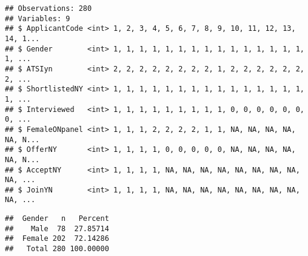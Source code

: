 \documentclass[]{article}
\newenvironment{Shaded}{\begin{snugshade}}{\end{snugshade}}
\newcommand{\KeywordTok}[1]{\textcolor[rgb]{0.13,0.29,0.53}{\textbf{#1}}}
\newcommand{\DataTypeTok}[1]{\textcolor[rgb]{0.13,0.29,0.53}{#1}}
\newcommand{\DecValTok}[1]{\textcolor[rgb]{0.00,0.00,0.81}{#1}}
\newcommand{\StringTok}[1]{\textcolor[rgb]{0.31,0.60,0.02}{#1}}
\newcommand{\CommentTok}[1]{\textcolor[rgb]{0.56,0.35,0.01}{\textit{#1}}}
\newcommand{\OperatorTok}[1]{\textcolor[rgb]{0.81,0.36,0.00}{\textbf{#1}}}
\newcommand{\NormalTok}[1]{#1}
\begin{document}
\begin{verbatim}
## Observations: 280
## Variables: 9
## $ ApplicantCode <int> 1, 2, 3, 4, 5, 6, 7, 8, 9, 10, 11, 12, 13, 14, 1...
## $ Gender        <int> 1, 1, 1, 1, 1, 1, 1, 1, 1, 1, 1, 1, 1, 1, 1, 1, ...
## $ ATSIyn        <int> 2, 2, 2, 2, 2, 2, 2, 2, 1, 2, 2, 2, 2, 2, 2, 2, ...
## $ ShortlistedNY <int> 1, 1, 1, 1, 1, 1, 1, 1, 1, 1, 1, 1, 1, 1, 1, 1, ...
## $ Interviewed   <int> 1, 1, 1, 1, 1, 1, 1, 1, 1, 0, 0, 0, 0, 0, 0, 0, ...
## $ FemaleONpanel <int> 1, 1, 1, 2, 2, 2, 2, 1, 1, NA, NA, NA, NA, NA, N...
## $ OfferNY       <int> 1, 1, 1, 1, 0, 0, 0, 0, 0, NA, NA, NA, NA, NA, N...
## $ AcceptNY      <int> 1, 1, 1, 1, NA, NA, NA, NA, NA, NA, NA, NA, NA, ...
## $ JoinYN        <int> 1, 1, 1, 1, NA, NA, NA, NA, NA, NA, NA, NA, NA, ...
\end{verbatim}

\begin{Shaded}
\end{Shaded}

\begin{verbatim}
##  Gender   n   Percent
##    Male  78  27.85714
##  Female 202  72.14286
##   Total 280 100.00000
\end{verbatim}
\end{document}
